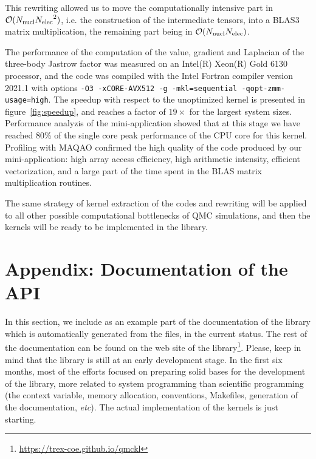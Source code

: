 This rewriting allowed us to move the computationally intensive part in
$\mathcal{O}(N_{\text{nucl}}{N_{\text{elec}}}^2)$, i.e. the construction of the intermediate
tensors, into a BLAS3 matrix multiplication, the remaining part being
in $\mathcal{O}(N_{\text{nucl}} N_{\text{elec}})$.

The performance of the computation of the value, gradient and Laplacian of
the three-body Jastrow factor was measured on an Intel(R) Xeon(R) Gold
6130 processor, and the code was compiled with the Intel Fortran
compiler version 2021.1 with options
\texttt{-O3 -xCORE-AVX512 -g -mkl=sequential -qopt-zmm-usage=high}.
The speedup with respect to the unoptimized kernel is presented in
figure~\ref{fig:speedup}, and reaches a factor of $19\times$ for the
largest system sizes. Performance analyzis of the mini-application
showed that at this stage we have reached 80\% of the single core peak
performance of the CPU core for this kernel. Profiling with MAQAO
confirmed the high quality of the code produced by our mini-application:
high array access efficiency, high arithmetic intensity, efficient
vectorization, and a large part of the time spent in the BLAS matrix
multiplication routines.

The same strategy of kernel extraction of the codes and rewriting
will be applied to all other possible computational bottlenecks of QMC
simulations, and then the kernels will be ready to be implemented in
the library.




\appendix
\section{Appendix: Documentation of the API}

In this section, we include as an example part of the documentation of
the library which is automatically generated from the {\orgmode}
files, in the current status. The rest of the documentation can be
found on the web site of the library\footnote{\url{https://trex-coe.github.io/qmckl}}.
Please, keep in mind that the library is still at an early development
stage. In the first six months, most of the efforts focused on
preparing solid bases for the development of
the library, more related to system programming than scientific
programming (the context variable, memory allocation, conventions,
Makefiles, generation of the documentation, \textit{etc}). The actual
implementation of the kernels is just starting.


\clearpage


